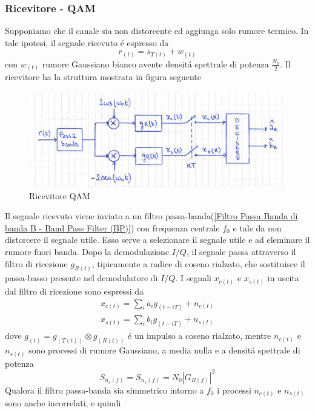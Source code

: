         \subsubsection{Ricevitore - QAM}
            Supponiamo che il canale sia non distorcente ed aggiunga solo rumore termico. In tale ipotesi, il segnale ricevuto 
            é espresso da
            \[
                r_{(t)} = s_{T(t)}+w_{(t)}    
            \]
            con $w_{(t)}$ rumore Gaussiano bianco avente densitá spettrale di potenza $\frac{N_0}{2}$. Il ricevitore ha la
            struttura mostrata in figura seguente 
            \begin{figure}[H]
                \centering
                \includegraphics[width = 12cm]{media/ricevitore qam.png}
                \caption{Ricevitore QAM}
            \end{figure}            
            Il segnale ricevuto viene inviato a un filtro passa-banda(\ref{Filtro Passa Banda di banda B - Band Pass Filter (BP)})
            con frequenza centrale $f_0$ e tale da non distorcere il segnale utile. Esso serve a selezionare il segnale utile e ad 
            eleminare il rumore fuori banda. Dopo la demodulazione $I/Q$, il segnale passa attraverso il filtro di ricezione $g_{R(t)}$,
            tipicamente a radice di coseno rialzato, che sostituisce il passa-basso presente nel demodulatore di $I/Q$. I segnali 
            $x_{c(t)}$ e $x_{s(t)}$ in uscita dal filtro di ricezione sono espressi da 
            \begin{gather}
                x_{c(t)} = \sum_{i}a_ig_{(t-iT)}+n_{c(t)}\nonumber \\
                x_{s(t)} = \sum_{i}b_ig_{(t-iT)}+n_{s(t)}\nonumber
            \end{gather}
            dove $g_{(t)} = g_{(T(t))}\otimes g_{(R(t))}$ é un impulso a coseno rialzato, mentre $n_{c(t)}$ e $n_{s(t)}$ sono 
            processi di rumore Gaussiano, a media nulla e a densitá spettrale di potenza
            \[
                S_{n_c(f)} = S_{n_s(f)} = N_0\left|G_{R(f)}\right|^2   
            \]
            Qualora il filtro passa-banda sia simmetrico intorno a $f_0$ i processi $n_{c(t)}$ e $n_{s(t)}$ sono anche incorrelati, e quindi 
